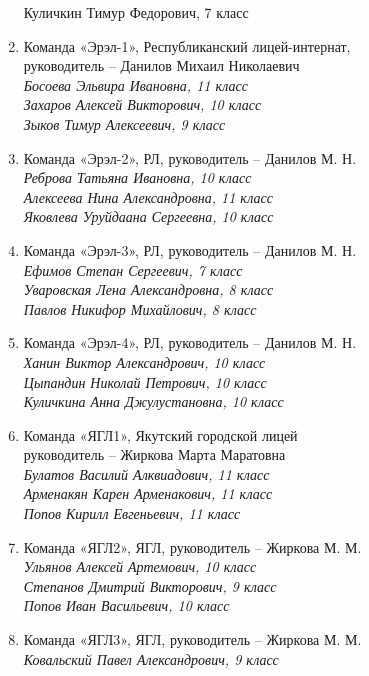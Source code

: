 \begin{enumerate}
\indent Куличкин Тимур Федорович, 7 класс
\rm
\item
Команда «Эрэл-1», Республиканский лицей-интернат,\\ руководитель – Данилов Михаил Николаевич\\
\it
\indent Босоева Эльвира Ивановна, 11 класс	\\
\indent Захаров Алексей Викторович, 10 класс\\
\indent Зыков Тимур Алексеевич, 9 класс
\rm
\item
Команда «Эрэл-2», РЛ, руководитель – Данилов М. Н.\\
\it
\indent Реброва Татьяна Ивановна, 10 класс\\
\indent Алексеева Нина Александровна, 11 класс\\
\indent Яковлева Уруйдаана Сергеевна, 10 класс
\rm
\item
Команда «Эрэл-3», РЛ, руководитель – Данилов М. Н.\\
\it
\indent Ефимов Степан Сергеевич, 7 класс\\
\indent Уваровская Лена Александровна, 8 класс\\
\indent Павлов Никифор Михайлович, 8 класс
\rm
\item
Команда «Эрэл-4», РЛ, руководитель – Данилов М. Н.\\
\it
\indent Ханин Виктор Александрович, 10 класс\\
\indent Цыпандин Николай Петрович, 10 класс\\
\indent Куличкина Анна Джулустановна, 10 класс
\rm
\item
Команда «ЯГЛ1», Якутский городской лицей\\ руководитель – Жиркова Марта Маратовна\\
\it
\indent Булатов Василий Алквиадович, 11 класс\\
\indent Арменакян Карен Арменакович, 11 класс\\
\indent Попов Кирилл Евгеньевич, 11 класс
\rm
\item
Команда «ЯГЛ2», ЯГЛ, руководитель – Жиркова М. М.\\
\it
\indent Ульянов Алексей Артемович, 10 класс\\
\indent Степанов Дмитрий Викторович, 9 класс\\
\indent Попов Иван Васильевич, 10 класс
\rm
\item
Команда «ЯГЛ3», ЯГЛ, руководитель – Жиркова М. М.\\
\it
\indent Ковальский Павел Александрович, 9 класс\\

\end{enumerate}
